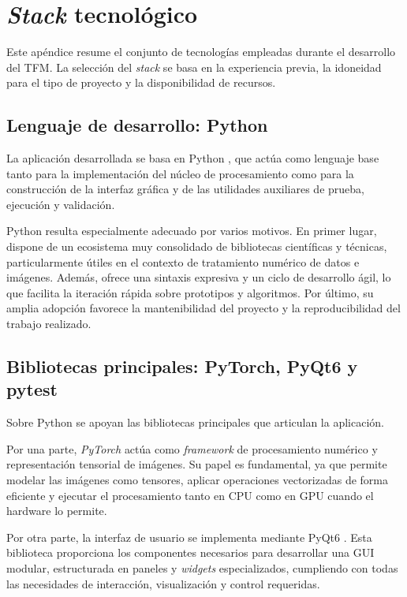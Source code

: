 \section{\textit{Stack} tecnológico} \label{sec:appendix_C_technology_stack}

Este apéndice resume el conjunto de tecnologías empleadas durante el desarrollo
del TFM. La selección del \textit{stack} se basa en la experiencia previa,
la idoneidad para el tipo de proyecto y la disponibilidad de recursos.

\subsection{Lenguaje de desarrollo: Python}

La aplicación desarrollada se basa en Python \cite{python}, que actúa como lenguaje base tanto para
la implementación del núcleo de procesamiento como para la construcción de la
interfaz gráfica y de las utilidades auxiliares de prueba, ejecución y
validación.

Python resulta especialmente adecuado por varios motivos. 
En primer lugar, dispone de un ecosistema muy consolidado de bibliotecas científicas y 
técnicas, particularmente útiles en el contexto de tratamiento numérico de datos e imágenes.
Además, ofrece una sintaxis expresiva y un ciclo de desarrollo ágil, lo que facilita la 
iteración rápida sobre prototipos y algoritmos. Por último, su amplia adopción 
favorece la mantenibilidad del proyecto y la reproducibilidad del trabajo realizado.

\subsection{Bibliotecas principales: PyTorch, PyQt6 y pytest}

Sobre Python se apoyan las bibliotecas principales que articulan la
aplicación.

Por una parte, \textit{PyTorch} \cite{pytorch} actúa como \textit{framework} de
procesamiento numérico y representación tensorial de imágenes. Su papel es fundamental, 
ya que permite modelar las imágenes como tensores,
aplicar operaciones vectorizadas de forma eficiente y ejecutar el
procesamiento tanto en CPU como en GPU cuando el hardware lo permite.

Por otra parte, la interfaz de usuario se implementa mediante
PyQt6 \cite{pyqt6}. Esta biblioteca proporciona los componentes necesarios para
desarrollar una GUI modular, estructurada en paneles y \textit{widgets} especializados,
cumpliendo con todas las necesidades de interacción, visualización y control requeridas.

